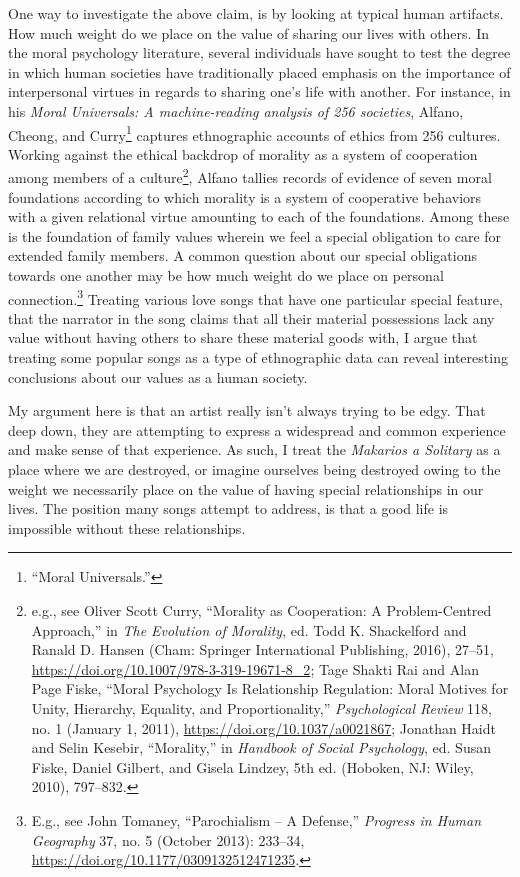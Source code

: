 \documentclass[phdthesis,12pt,final,a4paper]{wuthesis}
\theoremstyle{definition}
\theoremstyle{definition}
\theoremstyle{definition}
\theoremstyle{definition}
\theoremstyle{remark}
\begin{document}
One way to investigate the above claim, is by looking at typical human artifacts. How much weight do we place on the value of sharing our lives with others. In the moral psychology literature, several individuals have sought to test the degree in which human societies have traditionally placed emphasis on the importance of interpersonal virtues in regards to sharing one's life with another. For instance, in his \emph{Moral Universals: A machine-reading analysis of 256 societies}, Alfano, Cheong, and Curry\footnote{{``Moral {Universals}.''}} captures ethnographic accounts of ethics from 256 cultures. Working against the ethical backdrop of morality as a system of cooperation among members of a culture\footnote{e.g., see Oliver Scott Curry, {``Morality as {Cooperation}: {A Problem-Centred Approach},''} in \emph{The {Evolution} of {Morality}}, ed. Todd K. Shackelford and Ranald D. Hansen (Cham: Springer International Publishing, 2016), 27--51, \url{https://doi.org/10.1007/978-3-319-19671-8_2}; Tage Shakti Rai and Alan Page Fiske, {``Moral Psychology Is Relationship Regulation: Moral Motives for Unity, Hierarchy, Equality, and Proportionality,''} \emph{Psychological Review} 118, no. 1 (January 1, 2011), \url{https://doi.org/10.1037/a0021867}; Jonathan Haidt and Selin Kesebir, {``Morality,''} in \emph{Handbook of Social Psychology}, ed. Susan Fiske, Daniel Gilbert, and Gisela Lindzey, 5th ed. (Hoboken, NJ: Wiley, 2010), 797--832.}, Alfano tallies records of evidence of seven moral foundations according to which morality is a system of cooperative behaviors with a given relational virtue amounting to each of the foundations. Among these is the foundation of family values wherein we feel a special obligation to care for extended family members. A common question about our special obligations towards one another may be how much weight do we place on personal connection.\footnote{E.g., see John Tomaney, {``Parochialism -- {A Defense},''} \emph{Progress in Human Geography} 37, no. 5 (October 2013): 233--34, \url{https://doi.org/10.1177/0309132512471235}.} Treating various love songs that have one particular special feature, that the narrator in the song claims that all their material possessions lack any value without having others to share these material goods with, I argue that treating some popular songs as a type of ethnographic data can reveal interesting conclusions about our values as a human society.

My argument here is that an artist really isn't always trying to be edgy. That deep down, they are attempting to express a widespread and common experience and make sense of that experience. As such, I treat the \emph{Makarios a Solitary} as a place where we are destroyed, or imagine ourselves being destroyed owing to the weight we necessarily place on the value of having special relationships in our lives. The position many songs attempt to address, is that a good life is impossible without these relationships.
\end{document}
